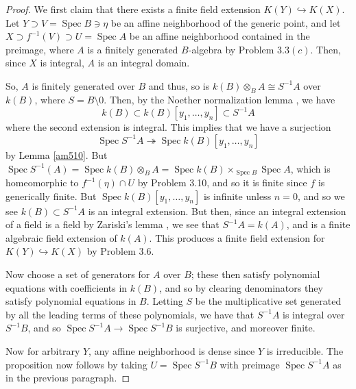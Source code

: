 \documentclass[12pt,letterpaper]{article}
\theoremstyle{definition}
\theoremstyle{remark}
\numberwithin{equation}{section}
\numberwithin{figure}{problem}
\DeclareMathOperator{\Spec}{Spec}
\begin{document}
\begin{proof}
  We first claim that there exists a finite field extension $K(Y) \hookrightarrow K(X)$. Let $Y \supset V = \Spec B \ni \eta$ be an affine neighborhood of the generic point, and let $X \supset f^{-1}(V) \supset U = \Spec A$ be an affine neighborhood contained in the preimage, where $A$ is a finitely generated $B$-algebra by Problem $3.3(c)$. Then, since $X$ is integral, $A$ is an integral domain.%
  \par So, $A$ is finitely generated over $B$ and thus, so is $k(B) \otimes_B A \cong S^{-1}A$ over $k(B)$, where $S = B \setminus 0$. Then, by the Noether normalization lemma \cite[14.G]{Mat70}, we have
  \begin{equation*}
    k(B) \subset k(B)[y_1,\ldots,y_n] \subset S^{-1}A
  \end{equation*}
  where the second extension is integral. This implies that we have a surjection
  \begin{equation*}
    \Spec S^{-1}A \twoheadrightarrow \Spec k(B)[y_1,\ldots,y_n]
  \end{equation*}
  by Lemma \ref{am510}. But $\Spec S^{-1}(A) = \Spec k(B) \otimes_B A = \Spec k(B) \times_{\Spec B} \Spec A$, which is homeomorphic to $f^{-1}(\eta) \cap U$ by Problem 3.10, and so it is finite since $f$ is generically finite. But $\Spec k(B)[y_1,\ldots,y_n]$ is infinite unless $n = 0$, and so we see $k(B) \subset S^{-1}A$ is an integral extension. But then, since an integral extension of a field is a field by Zariski's lemma \cite[Prop.~4.9]{Rei95}, we see that $S^{-1}A = k(A)$, and is a finite algebraic field extension of $k(A)$. This produces a finite field extension for $K(Y) \hookrightarrow K(X)$ by Problem $3.6$.
  \par Now choose a set of generators for $A$ over $B$; these then satisfy polynomial equations with coefficients in $k(B)$, and so by clearing denominators they satisfy polynomial equations in $B$. Letting $S$ be the multiplicative set generated by all the leading terms of these polynomials, we have that $S^{-1}A$ is integral over $S^{-1}B$, and so $\Spec S^{-1}A \to \Spec S^{-1}B$ is surjective, and moreover finite.
  \par Now for arbitrary $Y$, any affine neighborhood is dense since $Y$ is irreducible. The proposition now follows by taking $U = \Spec S^{-1}B$ with preimage $\Spec S^{-1}A$ as in the previous paragraph.
\end{proof}
\end{document}
